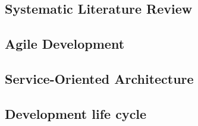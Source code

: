 \subsection{Systematic Literature Review}
\label{subsec:SLR}


\subsection{Agile Development}
\label{subsec:AgileDevelopment}


\subsection{Service-Oriented Architecture}
\label{subsec:SOA}


\subsection{Development life cycle}
\label{subsec:DevelopmentLifeCycle}

